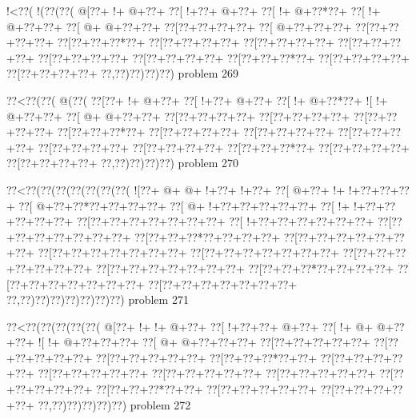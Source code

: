 \vbox{\vbox{\goo
\- !<\0??(\- !(\0??(\0??(
\- @[\0??+\- !+\- @+\0??+
\0??[\- !+\0??+\- @+\0??+
\0??[\- !+\- @+\0??*\0??+
\0??[\- !+\- @+\0??+\0??+
\0??[\- @+\- @+\0??+\0??+
\0??[\0??+\0??+\0??+\0??+
\0??[\- @+\0??+\0??+\0??+
\0??[\0??+\0??+\0??+\0??+
\0??[\0??+\0??+\0??*\0??+
\0??[\0??+\0??+\0??+\0??+
\0??[\0??+\0??+\0??+\0??+
\0??[\0??+\0??+\0??+\0??+
\0??[\0??+\0??+\0??+\0??+
\0??[\0??+\0??+\0??+\0??+
\0??[\0??+\0??+\0??*\0??+
\0??[\0??+\0??+\0??+\0??+
\0??[\0??+\0??+\0??+\0??+
\0??,\0??)\0??)\0??)\0??)
}
\hfil problem 269\hfil\break
}

\vbox{\vbox{\goo
\0??<\0??(\0??(\- @(\0??(
\0??[\0??+\- !+\- @+\0??+
\0??[\- !+\0??+\- @+\0??+
\0??[\- !+\- @+\0??*\0??+
\- ![\- !+\- @+\0??+\0??+
\0??[\- @+\- @+\0??+\0??+
\0??[\0??+\0??+\0??+\0??+
\0??[\0??+\0??+\0??+\0??+
\0??[\0??+\0??+\0??+\0??+
\0??[\0??+\0??+\0??*\0??+
\0??[\0??+\0??+\0??+\0??+
\0??[\0??+\0??+\0??+\0??+
\0??[\0??+\0??+\0??+\0??+
\0??[\0??+\0??+\0??+\0??+
\0??[\0??+\0??+\0??+\0??+
\0??[\0??+\0??+\0??*\0??+
\0??[\0??+\0??+\0??+\0??+
\0??[\0??+\0??+\0??+\0??+
\0??,\0??)\0??)\0??)\0??)
}
\hfil problem 270\hfil\break
}

\vbox{\vbox{\goo
\0??<\0??(\0??(\0??(\0??(\0??(\0??(\0??(
\- ![\0??+\- @+\- @+\- !+\0??+\- !+\0??+
\0??[\- @+\0??+\- !+\- !+\0??+\0??+\0??+
\0??[\- @+\0??+\0??*\0??+\0??+\0??+\0??+
\0??[\- @+\- !+\0??+\0??+\0??+\0??+\0??+
\0??[\- !+\- !+\0??+\0??+\0??+\0??+\0??+
\0??[\0??+\0??+\0??+\0??+\0??+\0??+\0??+
\0??[\- !+\0??+\0??+\0??+\0??+\0??+\0??+
\0??[\0??+\0??+\0??+\0??+\0??+\0??+\0??+
\0??[\0??+\0??+\0??*\0??+\0??+\0??+\0??+
\0??[\0??+\0??+\0??+\0??+\0??+\0??+\0??+
\0??[\0??+\0??+\0??+\0??+\0??+\0??+\0??+
\0??[\0??+\0??+\0??+\0??+\0??+\0??+\0??+
\0??[\0??+\0??+\0??+\0??+\0??+\0??+\0??+
\0??[\0??+\0??+\0??+\0??+\0??+\0??+\0??+
\0??[\0??+\0??+\0??*\0??+\0??+\0??+\0??+
\0??[\0??+\0??+\0??+\0??+\0??+\0??+\0??+
\0??[\0??+\0??+\0??+\0??+\0??+\0??+\0??+
\0??,\0??)\0??)\0??)\0??)\0??)\0??)\0??)
}
\hfil problem 271\hfil\break
}

\vbox{\vbox{\goo
\0??<\0??(\0??(\0??(\0??(\0??(
\- @[\0??+\- !+\- !+\- @+\0??+
\0??[\- !+\0??+\0??+\- @+\0??+
\0??[\- !+\- @+\- @+\0??+\0??+
\- ![\- !+\- @+\0??+\0??+\0??+
\0??[\- @+\- @+\0??+\0??+\0??+
\0??[\0??+\0??+\0??+\0??+\0??+
\0??[\0??+\0??+\0??+\0??+\0??+
\0??[\0??+\0??+\0??+\0??+\0??+
\0??[\0??+\0??+\0??*\0??+\0??+
\0??[\0??+\0??+\0??+\0??+\0??+
\0??[\0??+\0??+\0??+\0??+\0??+
\0??[\0??+\0??+\0??+\0??+\0??+
\0??[\0??+\0??+\0??+\0??+\0??+
\0??[\0??+\0??+\0??+\0??+\0??+
\0??[\0??+\0??+\0??*\0??+\0??+
\0??[\0??+\0??+\0??+\0??+\0??+
\0??[\0??+\0??+\0??+\0??+\0??+
\0??,\0??)\0??)\0??)\0??)\0??)
}
\hfil problem 272\hfil\break
}

